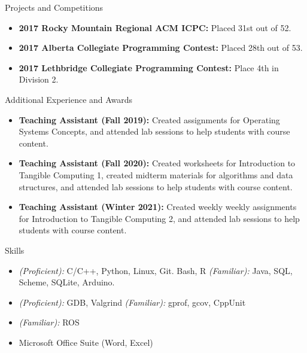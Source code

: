 \documentclass[]{mcdowellcv}
\begin{document}
\vspace*{-10pt}

\begin{cvsection}{Projects and Competitions}
  \begin{cvsubsection}{}{}{}
    \begin{itemize}
      \item \textbf{2017 Rocky Mountain Regional ACM ICPC:} Placed 31st out of 52.
      \item \textbf{2017 Alberta Collegiate Programming Contest:} Placed 28th out of 53.
      \item \textbf{2017 Lethbridge Collegiate Programming Contest:} Place 4th in Division 2.
    \end{itemize}
  \end{cvsubsection}
\end{cvsection}

\vspace*{-10pt}

\begin{cvsection}{Additional Experience and Awards}
  \begin{cvsubsection}{}{}{}	
    \begin{itemize}
      \item \textbf{Teaching Assistant (Fall 2019):} Created assignments for Operating Systems Concepts, and attended lab sessions to help students with course content.
      \item \textbf{Teaching Assistant (Fall 2020):} Created worksheets for Introduction to Tangible Computing 1, created midterm materials for algorithms and data structures, and attended lab sessions to help students with course content.
      \item \textbf{Teaching Assistant (Winter 2021):} Created weekly weekly assignments for Introduction to Tangible Computing 2, and attended lab sessions to help students with course content.
    \end{itemize}
  \end{cvsubsection}
\end{cvsection}

\vspace*{-10pt}

\begin{cvsection}{Skills}
  \begin{cvsubsection}{}{}{}	
    \begin{itemize}
      \item \emph{(Proficient):} C/C++, Python, Linux, Git. Bash, R  
            \emph{(Familiar):} Java, SQL, Scheme, SQLite, Arduino.
      \item \emph{(Proficient):} GDB, Valgrind
            \emph{(Familiar):} gprof, gcov, CppUnit
          \item \emph{(Familiar):} ROS      
      \item Microsoft Office Suite (Word, Excel)
    \end{itemize}
  \end{cvsubsection}
\end{cvsection}
\end{document}
